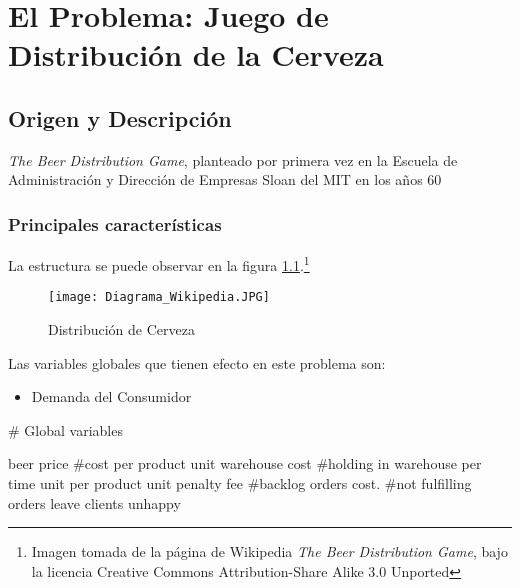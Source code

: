\chapter{El Problema: Juego de Distribuci\'on de la Cerveza}





\section{Origen y Descripci\'on}

\textit{The Beer Distribution Game}, planteado por primera vez en la Escuela de Administraci\'on y Direcci\'on de Empresas Sloan del MIT en los años 60

\subsection{Principales caracter\'isticas}

La estructura se puede observar en la figura \ref{diagram_wikipedia}.\footnote{Imagen tomada de la página de Wikipedia \textit{The Beer Distribution Game}, bajo la licencia Creative Commons Attribution-Share Alike 3.0 Unported}\\


\begin{figure}[h]
\caption{Distribución de Cerveza}
\label{diagram_wikipedia}
\texttt{[image: Diagrama\_Wikipedia.JPG]}
\centering
\end{figure}

Las variables globales que tienen efecto en este problema son:
\begin{itemize}
    \item Demanda del Consumidor
\end{itemize}


# Global variables

beer price          #cost per product unit
warehouse cost      #holding in warehouse per time unit per product unit
penalty fee         #backlog orders cost. 
                    #not fulfilling orders leave clients unhappy


